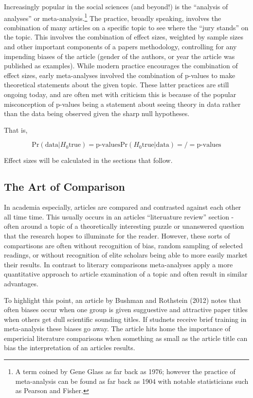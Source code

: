 \documentclass[12pt]{article}\usepackage[]{graphicx}\usepackage[]{color}
\begin{document}
\begin{flushleft}
Increasingly popular in the social sciences (and beyond!) is the ``analysis of analyses'' or meta-analysis.\footnote{A term coined by Gene Glass as far back as 1976; however the practice of meta-analysis can be found as far back as 1904 with notable statisticians such as Pearson and Fisher.} The practice, broadly speaking, involves the combination of many articles on a specific topic to see where the ``jury stands'' on the topic. This involves the combination of effect sizes, weighted by sample sizes and other important components of a papers methodology, controlling for any impending biases of the article (gender of the authors, or year the article was published as examples). While modern practice encourages the combination of effect sizes, early meta-analyses involved the combination of p-values to make theoretical statements about the given topic. These latter practices are still ongoing today, and are often met with criticism this is because of the popular misconception of p-values being a statement about seeing theory in data rather than the data being observed given the sharp null hypotheses. 

That is,

\begin{equation}
\text{Pr}(\text{data}| H_0 \text{true}) = \text{p-values}

\text{Pr}(H_0 \text{true} | \text{data}) =/= \text{p-values}
\end{equation}

Effect sizes will be calculated in the sections that follow.


\subsection{The Art of Comparison}

In academia especially, articles are compared and contrasted against each other all time time. This usually occurs in an articles ``literuature review'' section - often around a topic of a theoretically interesting puzzle or unanswered question that the research hopes to illuminate for the reader. However, these sorts of compartisons are often without recognition of bias, random sampling of selected readings, or without recognition of elite scholars being able to more easily market their results. In contrast to literary comparisons meta-analyses apply a more quantitative approach to article examination of a topic and often result in similar advantages.

To highlight this point, an article by Bushman and Rothstein (2012) notes that often biases occur when one group is given sugguestive and attractive paper titles when others get dull scientific sounding titles. If studnets receive brief training in meta-analysis these biases go away. The article hits home the importance of empericial literature comparisons when something as small as the article title can bias the interpretation of an articles results.


\end{flushleft}
\end{document}
